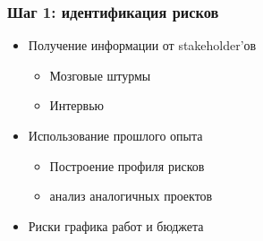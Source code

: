\documentclass{../../slides-style}
\begin{document}
    \begin{frame}
        \frametitle{Шаг 1: идентификация рисков}
        \begin{itemize}
            \item Получение информации от stakeholder’ов
            \begin{itemize}
                \item Мозговые штурмы
                \item Интервью
            \end{itemize}
            \item Использование прошлого опыта
            \begin{itemize}
                \item Построение профиля рисков
                \item анализ аналогичных проектов
            \end{itemize}
            \item Риски графика работ и бюджета
        \end{itemize}
    \end{frame}
\end{document}
